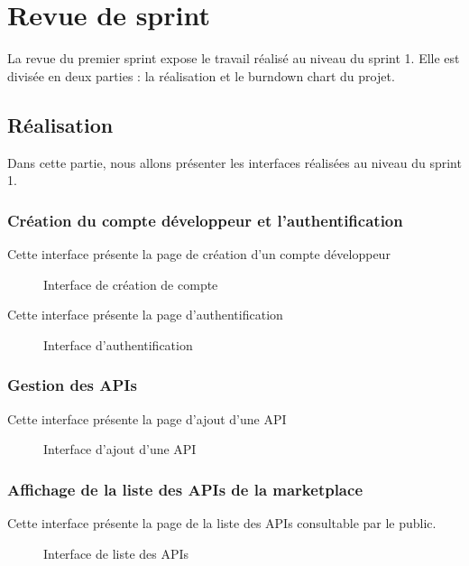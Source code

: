   
    \section{Revue de sprint}
    La revue du premier sprint expose le travail réalisé au niveau du sprint 1. Elle est divisée en deux parties : la réalisation et le burndown chart du projet.
    \subsection{Réalisation }
    Dans cette partie, nous allons présenter les interfaces réalisées au niveau du sprint 1.
    \subsubsection{Création du compte développeur et l'authentification}
        Cette interface présente la page de création d'un compte développeur 
        \begin{figure}[H]
            \centering
            \caption{Interface de création de compte}
            \label{fig:logo_tt}
        \end{figure}
    \pagebreak

        Cette interface présente la page d’authentification
        \begin{figure}[H]
            \centering
            \caption{Interface d'authentification}
            \label{fig:logo_tt}
        \end{figure}

    \subsubsection{Gestion des APIs  }
    Cette interface présente la page d'ajout d'une API
    \begin{figure}[H]
        \centering
        \caption{Interface d'ajout d'une API }
        \label{fig:logo_tt}
    \end{figure}
    \pagebreak


    \subsubsection{Affichage de la liste des APIs de la marketplace }	
    Cette interface présente la page de la liste des APIs consultable par le public.
    \begin{figure}[H]
        \centering
        \caption{ Interface de liste des APIs }
        \label{fig:logo_tt}
    \end{figure}
